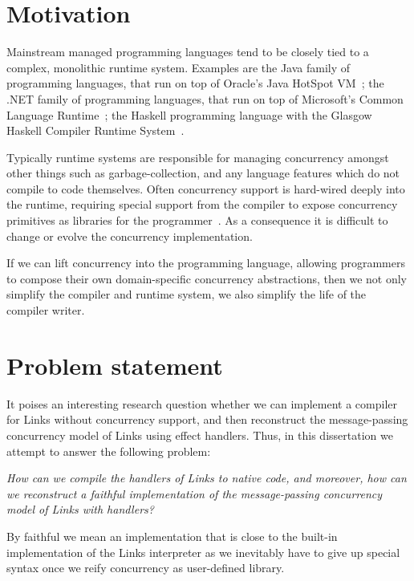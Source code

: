 \documentclass[12pt,mscres,cdtppar,twoside,openright,logo,rightchapter,normalheadings]{infthesis}
\theoremstyle{definition}
\begin{document}
\section{Motivation}
\label{sec:motivation}

Mainstream managed programming languages tend to be closely tied to a
complex, monolithic runtime system. Examples are the Java family of
programming languages, that run on top of Oracle's Java HotSpot
VM~\citep{HotSpot2016}; the .NET family of programming languages, that
run on top of Microsoft's Common Language Runtime~\citep{CLR2016}; the
Haskell programming language with the Glasgow Haskell Compiler Runtime
System~\citep{GHC2014}.

Typically runtime systems are responsible for managing concurrency
amongst other things such as garbage-collection, and any language
features which do not compile to code themselves. Often concurrency
support is hard-wired deeply into the runtime, requiring special
support from the compiler to expose concurrency primitives as
libraries for the programmer~\citep{KC2016}. As a consequence it is
difficult to change or evolve the concurrency implementation.

If we can lift concurrency into the programming language, allowing
programmers to compose their own domain-specific concurrency
abstractions, then we not only simplify the compiler and runtime
system, we also simplify the life of the compiler writer.
%

\section{Problem statement}
\label{sec:problem-statement}

It poises an interesting research question whether we can implement a
compiler for Links without concurrency support, and then reconstruct
the message-passing concurrency model of Links using effect
handlers. Thus, in this dissertation we attempt to answer the
following problem:

\begin{center}
  \emph{How can we compile the handlers of Links to native code, and
    moreover, how can we reconstruct a faithful implementation of the
    message-passing concurrency model of Links with handlers?}
\end{center}

By faithful we mean an implementation that is close to the built-in
implementation of the Links interpreter as we inevitably have to give
up special syntax once we reify concurrency as user-defined library.
\end{document}
